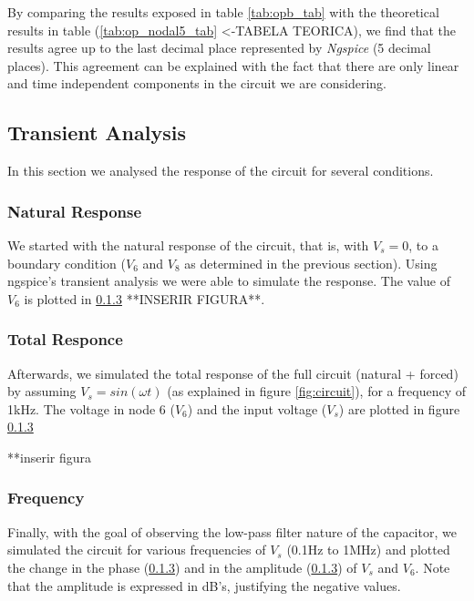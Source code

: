 By comparing the results exposed in table \ref{tab:opb_tab} with the 
theoretical results in table (\ref{tab:op_nodal5_tab} <-TABELA TEORICA), we 
find that the results agree up to the last decimal place represented 
by \textit{Ngspice} (5 decimal places). This agreement can be explained 
with the fact that there are only linear and time independent components 
in the circuit we are considering.


\subsection{Transient Analysis}

In this section we analysed the response of the circuit for several
conditions.

\subsubsection{Natural Response}

We started with the natural response of the circuit, that is, 
with $V_s=0$, to a boundary condition ($V_6$ and $V_8$ as determined 
in the previous section).
Using ngspice's transient analysis we were able to simulate the response. 
The value of $V_6$ is plotted in \ref{} **INSERIR FIGURA**.

\subsubsection{Total Responce}

Afterwards, we simulated the total response of the full circuit (natural 
+ forced) by assuming $V_s = sin(\omega t)$ (as explained in figure \ref{fig:circuit}), 
for a frequency of 1kHz.
The voltage in node 6 ($V_6$) and the input voltage ($V_s$) are plotted 
in figure \ref{}

**inserir figura

\subsubsection{Frequency }

Finally, with the goal of observing the low-pass filter nature 
of the capacitor, we simulated the circuit for various frequencies of 
$V_s$ (0.1Hz to 1MHz) and plotted the change in the phase (\ref{}) 
and in the amplitude (\ref{}) of $V_s$ and $V_6$. Note that the 
amplitude is expressed in dB's, justifying the negative values.








